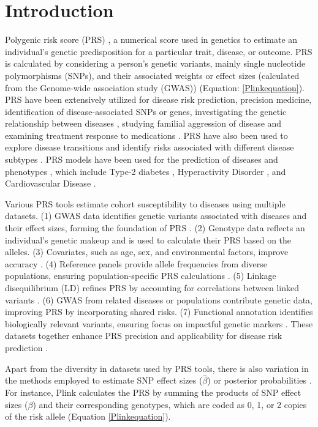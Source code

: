 \documentclass[pdflatex,sn-nature]{sn-jnl}%
\begin{document}
\section*{Introduction}
\label{Introduction}
Polygenic risk score (PRS) \cite{Choi2020,Lewis2020}, a numerical score used in genetics to estimate an individual's genetic predisposition for a particular trait, disease, or outcome. PRS is calculated by considering a person's genetic variants, mainly single nucleotide polymorphisms (SNPs), and their associated weights or effect sizes (calculated from the Genome-wide association study (GWAS)) (Equation: \ref{Plinkequation}). PRS have been extensively utilized for disease risk prediction, precision medicine, identification of disease-associated SNPs or genes, investigating the genetic relationship between diseases \cite{RN8133}, studying familial aggression of disease \cite{RN6771} and examining treatment response to medications \cite{RN5710}. PRS have also been used to explore disease transitions \cite{RN6695} and identify risks associated with different disease subtypes \cite{RN1471}. PRS models have been used for the prediction of diseases and phenotypes \cite{Collister2022}, which include Type-2 diabetes \cite{Merino2022}, Hyperactivity Disorder \cite{DuRietz2018}, and Cardiovascular Disease \cite{OSullivan2022}.

Various PRS tools estimate cohort susceptibility to diseases using multiple datasets. (1) GWAS data identifies genetic variants associated with diseases and their effect sizes, forming the foundation of PRS \cite{Nakase2024}. (2) Genotype data reflects an individual's genetic makeup and is used to calculate their PRS based on the alleles. (3) Covariates, such as age, sex, and environmental factors, improve accuracy \cite{Hui2023}. (4) Reference panels provide allele frequencies from diverse populations, ensuring population-specific PRS calculations \cite{Loh2023}. (5) Linkage disequilibrium (LD) refines PRS by accounting for correlations between linked variants \cite{Vilhjalmsson2015}. (6) GWAS from related diseases or populations contribute genetic data, improving PRS by incorporating shared risks. (7) Functional annotation identifies biologically relevant variants, ensuring focus on impactful genetic markers \cite{Zhuang2024}. These datasets together enhance PRS precision and applicability for disease risk prediction \cite{Ma2021}. 

Apart from the diversity in datasets used by PRS tools, there is also variation in the methods employed to estimate SNP effect sizes (\(\hat{\beta}\)) or posterior probabilities \cite{ZHU20201557,2024}. For instance, Plink calculates the PRS by summing the products of SNP effect sizes (\({\beta}\)) and their corresponding genotypes, which are coded as 0, 1, or 2 copies of the risk allele (Equation \ref{Plinkequation}).
\end{document}
